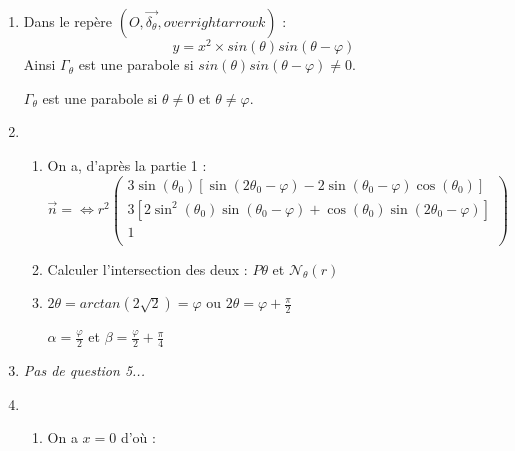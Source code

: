 \begin{enumerate}
  \item Dans le repère $(O, \overrightarrow{\delta_\theta}, overrightarrow{k})$ :
        \[
          y = x^{2} \times sin(\theta)sin(\theta - \varphi)
        \]
        Ainsi $\Gamma_\theta$ est une parabole si $sin(\theta)sin(\theta - \varphi) \neq 0$.
        \begin{result}
          $\Gamma_\theta$ est une parabole si $\theta\neq 0$ et $\theta\neq \varphi$.
        \end{result}
  \item \begin{enumerate}
          \item On a, d'après la partie 1 :
                \[
                  \overrightarrow{n} =
                  \iff r^{2}
                  \left(
                  \begin{array}{c}
                      3\sin{(\theta_0)}\left[ \sin{(2\theta_0 - \varphi)} - 2\sin{(\theta_0 - \varphi)}\cos{(\theta_0)}\right]       \\
                      3\left[ 2\sin^{2}{(\theta_0)}\sin{(\theta_0 - \varphi)} + \cos{(\theta_0)} \sin{(2\theta_0 - \varphi)} \right] \\
                      1                                                                                                              \\
                    \end{array}
                  \right)
                \]
          \item Calculer l'intersection des deux : $P\theta$ et $\mathcal{N}_\theta(r)$
          \item $2\theta = arctan(2\sqrt{2}) = \varphi$ ou $2\theta = \varphi + \frac{\pi}{2}$
                \begin{result}
                  $\alpha = \frac{\varphi}{2}$ et $\beta = \frac{\varphi}{2} + \frac{\pi}{4}$
                \end{result}
        \end{enumerate}
  \item \textit{Pas de question 5...}
  \item \begin{enumerate}
          \item On a $x = 0$ d'où :
\end{enumerate}
\end{enumerate}
